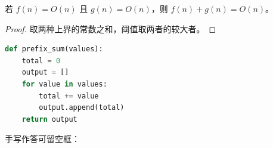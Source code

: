 \documentclass{homework}
\begin{document}
\begin{theorem}
  若 $f(n)=O(n)$ 且 $g(n)=O(n)$，则 $f(n)+g(n)=O(n)$。
\end{theorem}

\begin{proof}
  取两种上界的常数之和，阈值取两者的较大者。
\end{proof}

\begin{lstlisting}[language=Python]
def prefix_sum(values):
    total = 0
    output = []
    for value in values:
        total += value
        output.append(total)
    return output
\end{lstlisting}


手写作答可留空框：
\answerbox{2.6cm}

\clearpage
\nocite{*}

\end{document}
